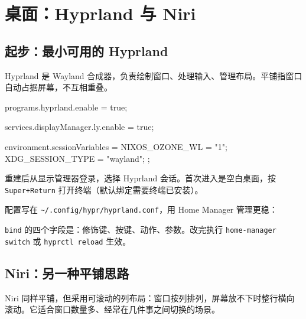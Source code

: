 \chapter{桌面：Hyprland 与 Niri}
\label{ch:desktop}

\section{起步：最小可用的 Hyprland}

Hyprland 是 Wayland 合成器，负责绘制窗口、处理输入、管理布局。平铺指窗口自动占据屏幕，不互相重叠。

\begin{nixcode}
programs.hyprland.enable = true;

services.displayManager.ly.enable = true;

environment.sessionVariables = {
  NIXOS_OZONE_WL = "1";
  XDG_SESSION_TYPE = "wayland";
};
\end{nixcode}

重建后从显示管理器登录，选择 Hyprland 会话。首次进入是空白桌面，按 \texttt{Super+Return} 打开终端（默认绑定需要终端已安装）。

配置写在 \texttt{\textasciitilde/.config/\allowbreak{}hypr/\allowbreak{}hyprland.conf}，用 Home Manager 管理更稳：


\texttt{bind} 的四个字段是：修饰键、按键、动作、参数。改完执行 \texttt{home-manager switch} 或 \texttt{hyprctl reload} 生效。

\section{Niri：另一种平铺思路}

Niri 同样平铺，但采用可滚动的列布局：窗口按列排列，屏幕放不下时整行横向滚动。它适合窗口数量多、经常在几件事之间切换的场景。

